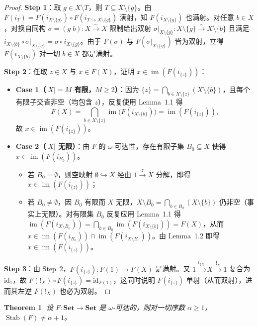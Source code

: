 \documentclass[11pt,a4paper]{ctexart}
\theoremstyle{plain}
\newtheorem{theorem}[lemma]{Theorem}
\newcommand{\Stab}{\operatorname{Stab}}
\newcommand{\im}{\operatorname{im}}
\newcommand{\id}{\mathrm{id}}
\newcommand{\Set}{\mathbf{Set}}
\begin{document}
\begin{proof}
\textbf{Step 1}：取 $g \in X \setminus T$，则 $T \subseteq X \setminus \{g\}$。由 $F(i_T) = F(i_{X\setminus\{g\}}) \circ F(i_{T \hookrightarrow X\setminus\{g\}})$ 满射，知 $F(i_{X\setminus\{g\}})$ 也满射。对任意 $b \in X$，对换自同构 $\sigma = (g\; b) : X \xrightarrow{\sim} X$ 限制给出双射 $\sigma|_{X\setminus\{g\}} : X \setminus \{g\} \xrightarrow{\sim} X \setminus \{b\}$ 且满足 $i_{X\setminus\{b\}} \circ \sigma|_{X\setminus\{g\}} = \sigma \circ i_{X\setminus\{g\}}$。由于 $F(\sigma)$ 与 $F(\sigma|_{X\setminus\{g\}})$ 皆为双射，立得 $F(i_{X\setminus\{b\}})$ 对一切 $b \in X$ 都是满射。

\textbf{Step 2}：任取 $z \in X$ 与 $x \in F(X)$，证明 $x \in \im(F(i_{\{z\}}))$：
\begin{itemize}[leftmargin=2em]
  \item \textbf{Case 1（$|X| = M$ 有限，$M \ge 2$）}：因为 $\{z\} = \bigcap_{b \in X \setminus \{z\}} (X \setminus \{b\})$，且每个有限子交皆非空（均包含 $z$），反复使用 Lemma~1.1 得
    \[
      F(X) = \bigcap_{b \in X \setminus \{z\}} \im\bigl(F(i_{X\setminus\{b\}})\bigr) = \im(F(i_{\{z\}})),
    \]
    故 $x \in \im(F(i_{\{z\}}))$。
  \item \textbf{Case 2（$|X|$ 无限）}：由 $F$ 的 $\omega$-可达性，存在有限子集 $B_0 \subseteq X$ 使得 $x \in \im(F(i_{B_0}))$。
    \begin{itemize}
      \item 若 $B_0 = \emptyset$，则空映射 $\emptyset \hookrightarrow X$ 经由 $1 \xrightarrow{z} X$ 分解，即得 $x \in \im(F(i_{\{z\}}))$；
      \item 若 $B_0 \neq \emptyset$，因 $B_0$ 有限而 $X$ 无限，$X \setminus B_0 = \bigcap_{b \in B_0} (X \setminus \{b\})$ 仍非空（事实上无限）。对有限集 $B_0$ 反复应用 Lemma~1.1 得 $\im(F(i_{X \setminus B_0})) = \bigcap_{b \in B_0} \im(F(i_{X\setminus\{b\}})) = F(X)$，从而 $x \in \im(F(i_{B_0})) \cap \im(F(i_{X \setminus B_0}))$。由 Lemma~1.2 即得 $x \in \im(F(i_{\{z\}}))$。
    \end{itemize}
\end{itemize}

\textbf{Step 3}：由 Step~2，$F(i_{\{z\}}) : F(1) \to F(X)$ 是满射。又 $1 \xrightarrow{i_{\{z\}}} X \xrightarrow{{!}_X} 1$ 复合为 $\id_1$，故 $F({!}_X) \circ F(i_{\{z\}}) = \id_{F(1)}$，这同时说明 $F(i_{\{z\}})$ 单射（从而双射），进而其左逆 $F({!}_X)$ 也必为双射。
\end{proof}

\begin{theorem}
设 $F : \Set \to \Set$ 是 $\omega$-可达的，则对一切序数 $\alpha \ge 1$，$\Stab(F) \neq \alpha + 1$。
\end{theorem}
\end{document}

